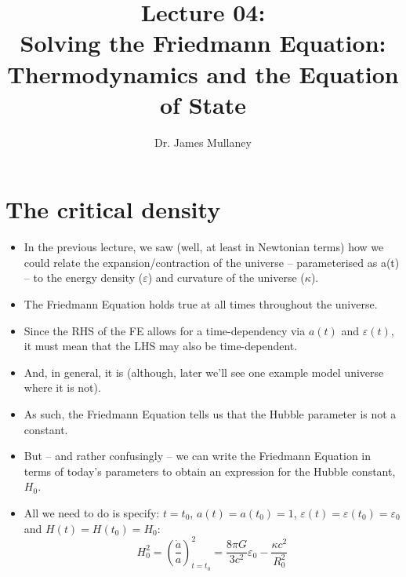 \documentclass[11pt]{article}
\begin{document}
 
\title{Lecture 04:\\Solving the Friedmann Equation: Thermodynamics and the Equation of State}
\author{Dr. James Mullaney}
\maketitle

\section{The critical density}
\begin{itemize}
\item In the previous lecture, we saw (well, at least in Newtonian terms) how we could relate the expansion/contraction of the universe -- parameterised as a(t) -- to the energy density ($\varepsilon$) and curvature of the universe ($\kappa$).
\item The Friedmann Equation holds true at all times throughout the universe.
\item Since the RHS of the FE allows for a time-dependency via $a(t)$ and $\varepsilon(t)$, it must mean that the LHS may also be time-dependent.
\item And, in general, it is (although, later we'll see one example model universe where it is not).
\item As such, the Friedmann Equation tells us that the Hubble parameter is not a constant.
\item But -- and rather confusingly -- we can write the Friedmann Equation in terms of today's parameters to obtain an expression for the Hubble constant, $H_0$.
\item All we need to do is specify: $t=t_0$, $a(t)=a(t_0)=1$, $\varepsilon(t)=\varepsilon(t_0)=\varepsilon_0$ and $H(t)=H(t_0)=H_0$:
\begin{equation}
H_0^2 = \left(\frac{\dot{a}}{a}\right)^2_{t=t_0} = \frac{8\pi G}{3c^2}\varepsilon_0 - \frac{\kappa c^2}{R_0^2}
\end{equation}


\end{itemize}
\end{document}
